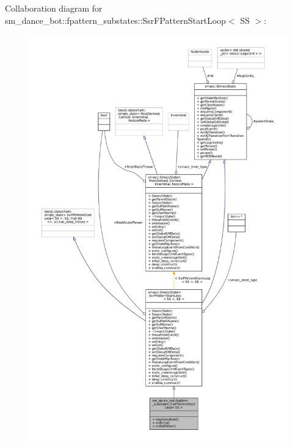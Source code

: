 Collaboration diagram for sm\+\_\+dance\+\_\+bot\+:\+:fpattern\+\_\+substates\+:\+:Ssr\+F\+Pattern\+Start\+Loop$<$ SS $>$\+:
\nopagebreak
\begin{figure}[H]
\begin{center}
\leavevmode
\includegraphics[width=350pt]{structsm__dance__bot_1_1fpattern__substates_1_1SsrFPatternStartLoop__coll__graph}
\end{center}
\end{figure}
